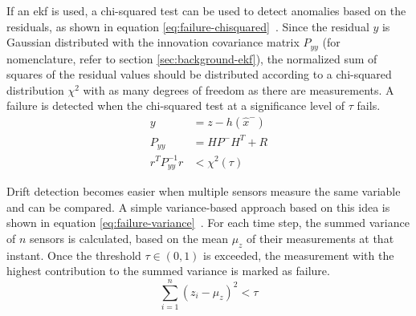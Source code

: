 If an \gls{ekf} is used, a chi-squared test can be used to detect anomalies based on the residuals, as shown in equation \ref{eq:failure-chisquared}~\cites[p.~4292]{Hausman.2016}[p.~2050~f.]{Valls.2018}. Since the residual $y$ is Gaussian distributed with the innovation covariance matrix $P_{yy}$ (for nomenclature, refer to section \ref{sec:background-ekf}), the normalized sum of squares of the residual values should be distributed according to a chi-squared distribution $\chi^2$ with as many degrees of freedom as there are measurements. A failure is detected when the chi-squared test at a significance level of $\tau$ fails.
\begin{subequations}\label{eq:failure-chisquared}
\begin{alignat}{2}%
y &= z - h(\hat{x}^-) \\%
P_{yy} &= H P^- H^T + R \\%
r^T P_{yy}^{-1} r &< \chi^2(\tau)%
\end{alignat}
\end{subequations}

Drift detection becomes easier when multiple sensors measure the same variable and can be compared. A simple variance-based approach based on this idea is shown in equation \ref{eq:failure-variance}~\cite[p.~20]{Kabzan.2019}. For each time step, the summed variance of $n$ sensors is calculated, based on the mean $\mu_z$ of their measurements at that instant. Once the threshold $\tau \in (0, 1)$ is exceeded, the measurement with the highest contribution to the summed variance is marked as failure.
\begin{equation}\label{eq:failure-variance}%
\sum_{i=1}^n (z_i - \mu_z)^2 < \tau%
\end{equation}

